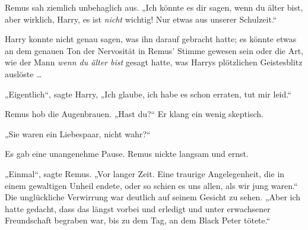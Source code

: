 Remus sah ziemlich unbehaglich aus.
„Ich könnte es dir sagen, wenn du älter bist, aber wirklich, Harry, es ist \emph{nicht} wichtig! Nur etwas aus unserer Schulzeit.“

Harry konnte nicht genau sagen, was ihn darauf gebracht hatte; es könnte etwas an dem genauen Ton der Nervosität in Remus’ Stimme gewesen sein oder die Art, wie der Mann \emph{wenn du älter bist} gesagt hatte, was Harrys plötzlichen Geistesblitz auslöste …

„Eigentlich“, sagte Harry,
„Ich glaube, ich habe es schon erraten, tut mir leid.“

Remus hob die Augenbrauen. „Hast du?“ Er klang ein wenig skeptisch.

„Sie waren ein Liebespaar, nicht wahr?“

Es gab eine unangenehme Pause.
Remus nickte langsam und ernst.

„Einmal“, sagte Remus. „Vor langer Zeit. Eine traurige Angelegenheit, die in einem gewaltigen Unheil endete, oder so schien es uns allen, als wir jung waren.“ Die unglückliche Verwirrung war deutlich auf seinem Gesicht zu sehen. „Aber ich hatte gedacht, dass das längst vorbei und erledigt und unter erwachsener Freundschaft begraben war, bis zu dem Tag, an dem Black Peter tötete.“